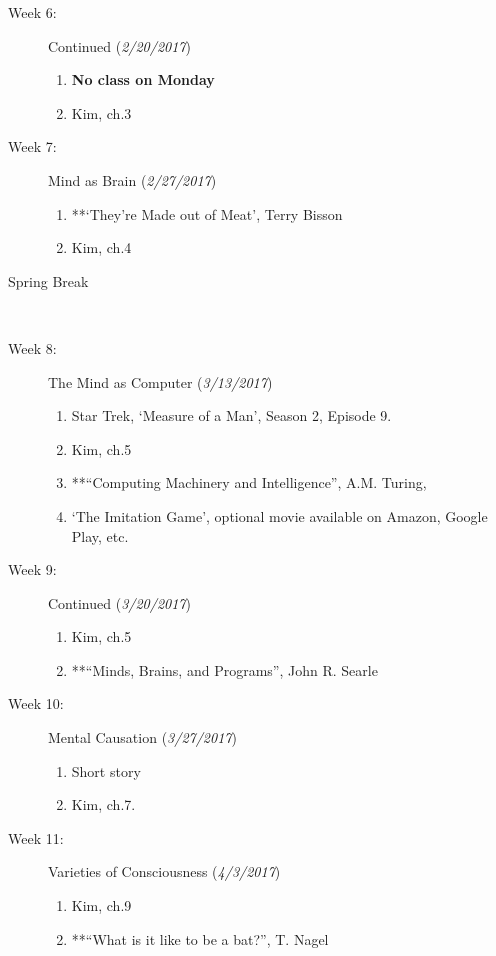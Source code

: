 \documentclass[article,oneside]{memoir}
\begin{document}
\begin{description}
\item[Week 6:] Continued  (\emph{2/20/2017})
\begin{enumerate}
\item \textbf{No class on Monday}
\item Kim, ch.3
\end{enumerate}

\item[Week 7:] Mind as Brain (\emph{2/27/2017})
\begin{enumerate}
\item **`They're Made out of Meat', Terry Bisson
\item Kim, ch.4
\end{enumerate}

\item[Spring Break]\


\item[Week 8:] The Mind as Computer (\emph{3/13/2017})
\begin{enumerate}
\item Star Trek, ‘Measure of a Man’, Season 2, Episode 9.
\item Kim, ch.5
\item **``Computing Machinery and Intelligence'', A.M. Turing, 
\item `The Imitation Game', optional movie available on Amazon, Google Play, etc. \end{enumerate}

\item[Week 9:] Continued  (\emph{3/20/2017})
\begin{enumerate}
\item Kim, ch.5
\item**``Minds, Brains, and Programs'', John R. Searle
\end{enumerate}


\item[Week 10:] Mental Causation (\emph{3/27/2017})
\begin{enumerate}
\item Short story
\item Kim, ch.7. 
\end{enumerate}

\item[Week 11:] Varieties of Consciousness (\emph{4/3/2017})
\begin{enumerate}
\item Kim, ch.9
\item **``What is it like to be a bat?'', T. Nagel
\end{enumerate}


\end{description}
\end{document}

